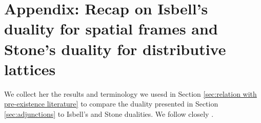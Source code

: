 \documentclass{article}
\theoremstyle{plain}
\theoremstyle{definition}
\theoremstyle{remark}
\newcommand{\bool}[1]{\mathsf{#1}}
\newcommand{\0}{\mathbbm 0}
\newcommand{\1}{\mathbbm 1}
\newcommand{\2}{\mathbbm 2}
\begin{document}
%
%



\section{Appendix: Recap on Isbell's duality for spatial frames and Stone's duality for distributive lattices}\label{Appendix}
We collect her the results and terminology we usesd in Section \ref{sec:relation with pre-existence literature} to compare the duality presented in Section \ref{sec:adjunctions} to Isbell's and Stone dualities.
We follow closely \cite{gehrke2024topological}.
\end{document}
